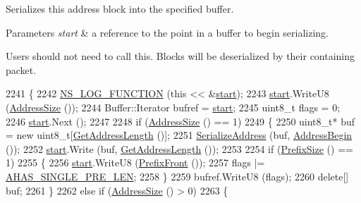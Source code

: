 Serializes this address block into the specified buffer. 


\begin{DoxyParams}{Parameters}
{\em start} & a reference to the point in a buffer to begin serializing.\\
\hline
\end{DoxyParams}
Users should not need to call this. Blocks will be deserialized by their containing packet. 
\begin{DoxyCode}
2241 \{
2242   \hyperlink{log-macros-disabled_8h_a90b90d5bad1f39cb1b64923ea94c0761}{NS\_LOG\_FUNCTION} (\textcolor{keyword}{this} << &\hyperlink{namespacevisualizer_1_1core_a2a35e5d8a34af358b508dac8635754e0}{start});
2243   \hyperlink{namespacevisualizer_1_1core_a2a35e5d8a34af358b508dac8635754e0}{start}.WriteU8 (\hyperlink{classns3_1_1PbbAddressBlock_a12f52e94b2f4197b1bc676b8d291a46e}{AddressSize} ());
2244   Buffer::Iterator bufref = \hyperlink{namespacevisualizer_1_1core_a2a35e5d8a34af358b508dac8635754e0}{start};
2245   uint8\_t flags = 0;
2246   \hyperlink{namespacevisualizer_1_1core_a2a35e5d8a34af358b508dac8635754e0}{start}.Next ();
2247 
2248   \textcolor{keywordflow}{if} (\hyperlink{classns3_1_1PbbAddressBlock_a12f52e94b2f4197b1bc676b8d291a46e}{AddressSize} () == 1)
2249     \{
2250       uint8\_t* buf = \textcolor{keyword}{new} uint8\_t[\hyperlink{classns3_1_1PbbAddressBlock_a0b96213a92a072027cc96a2e41c8eb24}{GetAddressLength} ()];
2251       \hyperlink{classns3_1_1PbbAddressBlock_a53207832167cad2ee8a7783f318c44aa}{SerializeAddress} (buf, \hyperlink{classns3_1_1PbbAddressBlock_a3eb4e97961cf32ffc66692ed2e9e8774}{AddressBegin} ());
2252       \hyperlink{namespacevisualizer_1_1core_a2a35e5d8a34af358b508dac8635754e0}{start}.Write (buf, \hyperlink{classns3_1_1PbbAddressBlock_a0b96213a92a072027cc96a2e41c8eb24}{GetAddressLength} ());
2253 
2254       \textcolor{keywordflow}{if} (\hyperlink{classns3_1_1PbbAddressBlock_a5c19f01e9a4e7f3bf60a4241cbb89fe7}{PrefixSize} () == 1)
2255         \{
2256           \hyperlink{namespacevisualizer_1_1core_a2a35e5d8a34af358b508dac8635754e0}{start}.WriteU8 (\hyperlink{classns3_1_1PbbAddressBlock_a3001703fcd36eaca33e3225da13a33ad}{PrefixFront} ());
2257           flags |= \hyperlink{packetbb_8cc_ae9281d5994a17d60f99f9e0f2cddecac}{AHAS\_SINGLE\_PRE\_LEN};
2258         \}
2259       bufref.WriteU8 (flags);
2260       \textcolor{keyword}{delete}[] buf;
2261     \}
2262   \textcolor{keywordflow}{else} \textcolor{keywordflow}{if} (\hyperlink{classns3_1_1PbbAddressBlock_a12f52e94b2f4197b1bc676b8d291a46e}{AddressSize} () > 0)
2263     \{

\end{DoxyCode}
